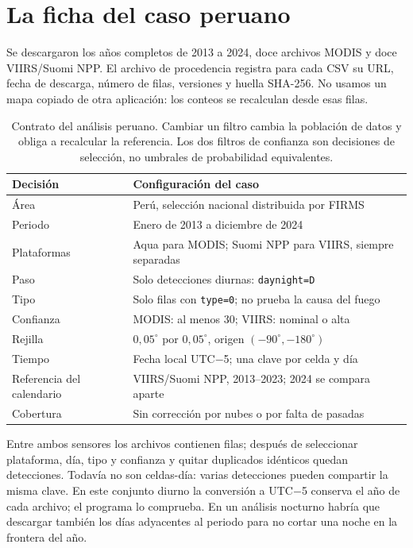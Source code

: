 \FloatBarrier
\section{La ficha del caso peruano}\label{sec:peru-ficha}

Se descargaron los años completos de 2013 a 2024, doce archivos MODIS y doce VIIRS/Suomi NPP.
El archivo de procedencia registra para cada CSV su URL, fecha de descarga, número de filas,
versiones y huella SHA-256. No usamos un mapa copiado de otra aplicación: los conteos se
recalculan desde esas filas.

\begin{table}[ht]
\centering\renewcommand{\arraystretch}{1.2}
\begin{tabularx}{\textwidth}{l>{\raggedright\arraybackslash}X}
\toprule
Decisión & Configuración del caso \\
\midrule
Área & Perú, selección nacional distribuida por FIRMS \\
Periodo & Enero de 2013 a diciembre de 2024 \\
Plataformas & Aqua para MODIS; Suomi NPP para VIIRS, siempre separadas \\
Paso & Solo detecciones diurnas: \texttt{daynight=D} \\
Tipo & Solo filas con \texttt{type=0}; no prueba la causa del fuego \\
Confianza & MODIS: al menos 30; VIIRS: nominal o alta \\
Rejilla & $0{,}05^\circ$ por $0{,}05^\circ$, origen $(-90^\circ,-180^\circ)$ \\
Tiempo & Fecha local UTC$-$5; una clave por celda y día \\
Referencia del calendario & VIIRS/Suomi NPP, 2013--2023; 2024 se compara aparte \\
Cobertura & Sin corrección por nubes o por falta de pasadas \\
\bottomrule
\end{tabularx}
\caption{Contrato del análisis peruano. Cambiar un filtro cambia la población de datos y obliga
a recalcular la referencia. Los dos filtros de confianza son decisiones de selección, no
umbrales de probabilidad equivalentes.}
\label{tab:contrato-peru}
\end{table}

Entre ambos sensores los archivos contienen \PeruFilas{} filas; después de seleccionar
plataforma, día, tipo y confianza y quitar duplicados idénticos quedan \PeruAceptadas{}
detecciones. Todavía no son celdas-día: varias detecciones pueden compartir la misma clave.
En este conjunto diurno la conversión a UTC$-$5 conserva el año de cada archivo; el programa
lo comprueba. En un análisis nocturno habría que descargar también los días adyacentes al
periodo para no cortar una noche en la frontera del año.

